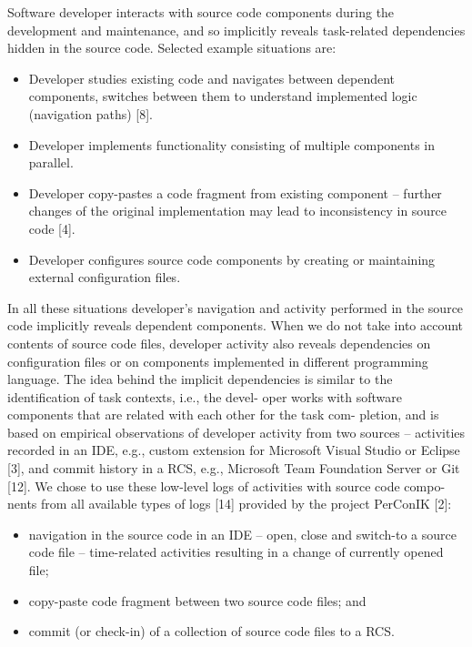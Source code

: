 \documentclass[a4paper]{llncs}
\begin{document}
Software developer interacts with source code components during the development and maintenance, and so implicitly reveals task-related dependencies hidden in the source code. Selected example situations are:
                                        
\newpage
\renewcommand{\labelitemi}{$\bullet$}
\begin{itemize}
\item
Developer studies existing code and navigates between dependent components, switches between them to understand implemented logic (navigation paths) [8].
\item
Developer implements functionality consisting of multiple components in parallel.
\item
Developer copy-pastes a code fragment from existing component – further changes
of the original implementation may lead to inconsistency in source code [4].
\item
Developer configures source code components by creating or maintaining external
configuration files.
\end{itemize}

\noindent In all these situations developer’s navigation and activity performed in the source code implicitly reveals dependent components. When we do not take into account contents of source code files, developer activity also reveals dependencies on configuration files or on components implemented in different programming language. The idea behind the implicit dependencies is similar to the identification of task contexts, i.e., the devel- oper works with software components that are related with each other for the task com- pletion, and is based on empirical observations of developer activity from two sources – activities recorded in an IDE, e.g., custom extension for Microsoft Visual Studio or Eclipse [3], and commit history in a RCS, e.g., Microsoft Team Foundation Server or Git [12]. We chose to use these low-level logs of activities with source code compo- nents from all available types of logs [14] provided by the project PerConIK [2]:

\begin{itemize}
\item
navigation in the source code in an IDE -- open, close and switch-to a source code file -- time-related activities resulting in a change of currently opened file;
\item
copy-paste code fragment between two source code files; and
\item
commit (or check-in) of a collection of source code files to a RCS.
\end{itemize}
\end{document}
